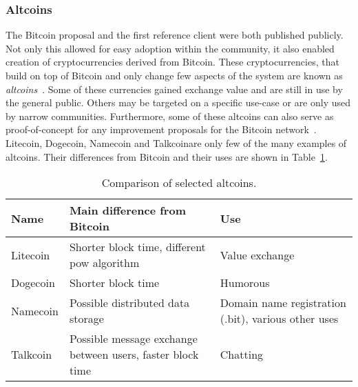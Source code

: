 \subsubsection{Altcoins}
The Bitcoin proposal and the first reference client were both published publicly. Not only this allowed for easy adoption within the community, it also enabled creation of cryptocurrencies derived from Bitcoin. These cryptocurrencies, that build on top of Bitcoin and only change few aspects of the system are known as \textit{altcoins}~\cite{Judmayer2017BlocksMechanisms}. Some of these currencies gained exchange value and are still in use by the general public. Others may be targeted on a specific use-case or are only used by narrow communities. Furthermore, some of these altcoins can also serve as proof-of-concept for any improvement proposals for the Bitcoin network~\cite{Tarasiewicz2015ChapterExperiments}. Litecoin, Dogecoin, Namecoin and Talkcoin\footnotemark are only few of the many examples of altcoins. Their differences from Bitcoin and their uses are shown in Table~\ref{tab:altcoins}.
% 
% 
\begin{table}[ht]
    \centering
    \begin{tabularx}{\textwidth}{|l|X|m{10em}|}
         \hline
         \textbf{Name}&\textbf{Main difference from Bitcoin}&\textbf{Use}\\
         \hline
         \hline
         Litecoin&Shorter block time, different \acrshort{pow} algorithm&Value exchange\\
         \hline
         Dogecoin&Shorter block time&Humorous\\
         \hline
         Namecoin&Possible distributed data storage&Domain name registration (.bit), various other uses\\
         \hline
         Talkcoin&Possible message exchange between users, faster block time&Chatting\\
         \hline 
    \end{tabularx}
    \caption{Comparison of selected altcoins.}
    \label{tab:altcoins}
\end{table}